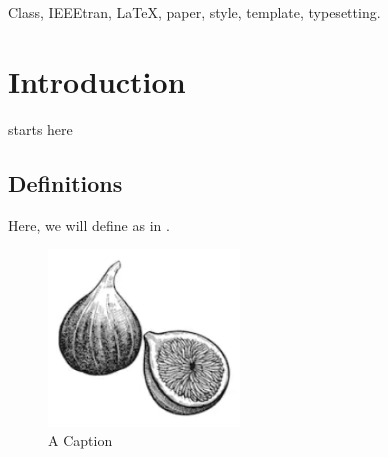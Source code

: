 \begin{abstract}
This document describes the most common article elements and how to use the IEEEtran class with \LaTeX \ to produce files that are suitable for submission to the Institute of Electrical and Electronics Engineers (IEEE).  IEEEtran can produce conference, journal and technical note (correspondence) papers with a suitable choice of class options.
\end{abstract}

\begin{IEEEkeywords}
Class, IEEEtran, \LaTeX, paper, style, template, typesetting.
\end{IEEEkeywords}


\section{Introduction}
 starts here

\subsection{Definitions}
Here, we will define \cite{FrictionPreferredGrasp} as in .
\begin{figure}[h]
    \centering
    \includegraphics[width=2in]{Figs/fig1}
    \caption{A Caption}
    \label{fig:1}
\end{figure}

